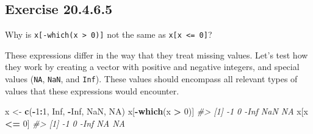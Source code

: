 \documentclass[]{book}
\newenvironment{Shaded}{\begin{snugshade}}{\end{snugshade}}
\newcommand{\CommentTok}[1]{\textcolor[rgb]{0.56,0.35,0.01}{\textit{#1}}}
\newcommand{\ControlFlowTok}[1]{\textcolor[rgb]{0.13,0.29,0.53}{\textbf{#1}}}
\newcommand{\DecValTok}[1]{\textcolor[rgb]{0.00,0.00,0.81}{#1}}
\newcommand{\KeywordTok}[1]{\textcolor[rgb]{0.13,0.29,0.53}{\textbf{#1}}}
\newcommand{\NormalTok}[1]{#1}
\newcommand{\OperatorTok}[1]{\textcolor[rgb]{0.81,0.36,0.00}{\textbf{#1}}}
\newcommand{\OtherTok}[1]{\textcolor[rgb]{0.56,0.35,0.01}{#1}}
\newcommand{\StringTok}[1]{\textcolor[rgb]{0.31,0.60,0.02}{#1}}
\theoremstyle{plain}
\theoremstyle{remark}
\begin{document}
\begin{enumerate}
\begin{Shaded}
\end{Shaded}
\end{enumerate}

\hypertarget{exercise-20.4.6.5}{%
\subsection*{\texorpdfstring{Exercise {20.4.6.5}}{Exercise 20.4.6.5}}\label{exercise-20.4.6.5}}

Why is \texttt{x{[}-which(x\ \textgreater{}\ 0){]}} not the same as \texttt{x{[}x\ \textless{}=\ 0{]}}?

These expressions differ in the way that they treat missing values.
Let's test how they work by creating a vector with positive and negative integers,
and special values (\texttt{NA}, \texttt{NaN}, and \texttt{Inf}). These values should encompass
all relevant types of values that these expressions would encounter.

\begin{Shaded}
\begin{Highlighting}[]
\NormalTok{x <-}\StringTok{ }\KeywordTok{c}\NormalTok{(}\OperatorTok{-}\DecValTok{1}\OperatorTok{:}\DecValTok{1}\NormalTok{, }\OtherTok{Inf}\NormalTok{, }\OperatorTok{-}\OtherTok{Inf}\NormalTok{, }\OtherTok{NaN}\NormalTok{, }\OtherTok{NA}\NormalTok{)}
\NormalTok{x[}\OperatorTok{-}\KeywordTok{which}\NormalTok{(x }\OperatorTok{>}\StringTok{ }\DecValTok{0}\NormalTok{)]}
\CommentTok{#> [1]   -1    0 -Inf  NaN   NA}
\NormalTok{x[x }\OperatorTok{<=}\StringTok{ }\DecValTok{0}\NormalTok{]}
\CommentTok{#> [1]   -1    0 -Inf   NA   NA}
\end{Highlighting}
\end{Shaded}
\end{document}
